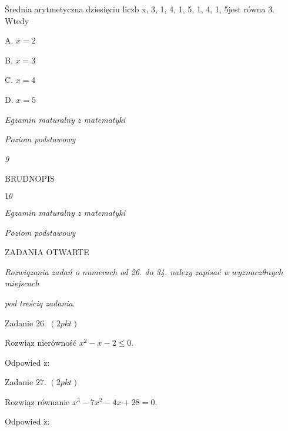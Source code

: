 \documentclass[a4paper,12pt]{article}
\begin{document}
Średnia arytmetyczna dziesięciu liczb x, 3, 1, 4, 1, 5, 1, 4, 1, 5jest równa 3. Wtedy

A. $x=2$

B. $x=3$

C. $x=4$

D. $x=5$





{\it Egzamin maturalny z matematyki}

{\it Poziom podstawowy}

{\it 9}

BRUDNOPIS





$ 1\theta$

{\it Egzamin maturalny z matematyki}

{\it Poziom podstawowy}

ZADANIA OTWARTE

{\it Rozwiqzania zadań o numerach od 26. do 34. nalezy zapisać w} $wyznacz\theta nych$ {\it miejscach}

{\it pod treściq zadania}.

Zadanie 26. $(2pkt)$

Rozwiąz nierówność $x^{2}-x-2\leq 0.$

Odpowied $\acute{\mathrm{z}}$:

Zadanie 27. $(2pkt)$

Rozwiąz równanie $x^{3}-7x^{2}-4x+28=0.$

Odpowied $\acute{\mathrm{z}}$:
\end{document}
